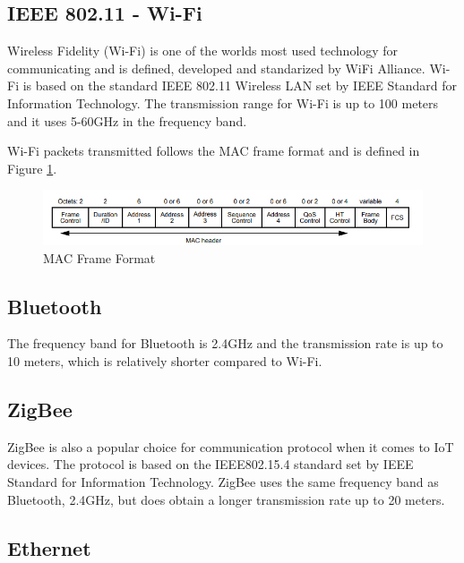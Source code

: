 \subsection*{IEEE 802.11 - Wi-Fi}
Wireless Fidelity (Wi-Fi) \cite{WiFiAlliance} is one of the worlds most used technology for communicating and is defined, developed and standarized by WiFi Alliance. \cite{WiFiAlliance} Wi-Fi is based on the standard IEEE 802.11 Wireless LAN set by IEEE Standard for Information Technology. \cite{WifiStandard} The transmission range for Wi-Fi is up to 100 meters and it uses 5-60GHz in the frequency band. \cite{IAQMonitorCommunicationReview}

Wi-Fi packets transmitted follows the MAC frame format and is defined in Figure \ref{MACFrameFormat}. \cite{WifiStandard} 
\begin{figure}
    \centering
    \includegraphics{figures/MACFrameFormat.png}
    \caption{MAC Frame Format \cite{WifiStandard}}
    \label{MACFrameFormat}
\end{figure}    

\subsection*{Bluetooth}
The frequency band for Bluetooth is 2.4GHz and the transmission rate is up to 10 meters, which is relatively shorter compared to Wi-Fi. \cite{IAQMonitorCommunicationReview}

\subsection*{ZigBee}
ZigBee is also a popular choice for communication protocol when it comes to IoT devices. The protocol is based on the IEEE802.15.4 standard set by IEEE Standard for Information Technology. \cite{ZigBeeStandard} ZigBee uses the same frequency band as Bluetooth, 2.4GHz, but does obtain a longer transmission rate up to 20 meters. \cite{IAQMonitorCommunicationReview} 

\subsection*{Ethernet}

